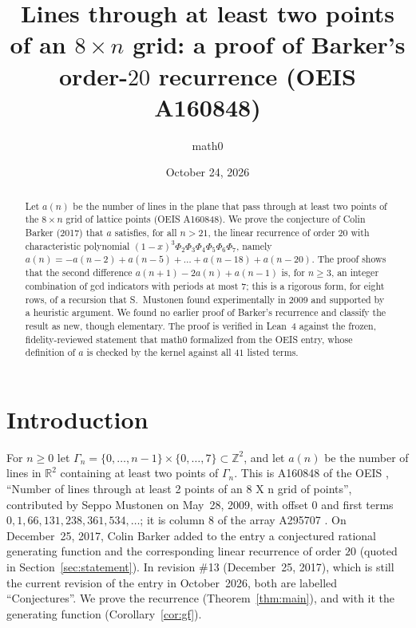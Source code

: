 \documentclass[11pt]{amsart}
\title[Barker's recurrence for lines through an $8\times n$ grid]{Lines through at least two points of an $8\times n$ grid: a proof of Barker's order-$20$ recurrence (OEIS A160848)}
\author{math0}
\date{October 24, 2026}
\theoremstyle{plain}
\theoremstyle{definition}
\newcommand{\Z}{\mathbb{Z}}
\begin{document}
\begin{abstract}
Let $a(n)$ be the number of lines in the plane that pass through at least two points of the $8\times n$ grid of lattice points (OEIS A160848).
We prove the conjecture of Colin Barker (2017) that $a$ satisfies, for all $n>21$, the linear recurrence of order $20$ with characteristic polynomial $(1-x)^3\Phi_2\Phi_3\Phi_4\Phi_5\Phi_6\Phi_7$, namely $a(n)=-a(n-2)+a(n-5)+\dots+a(n-18)+a(n-20)$.
The proof shows that the second difference $a(n+1)-2a(n)+a(n-1)$ is, for $n\ge3$, an integer combination of gcd indicators with periods at most $7$; this is a rigorous form, for eight rows, of a recursion that S.~Mustonen found experimentally in 2009 and supported by a heuristic argument.
We found no earlier proof of Barker's recurrence and classify the result as new, though elementary.
The proof is verified in Lean~4 against the frozen, fidelity-reviewed statement that math0 formalized from the OEIS entry, whose definition of $a$ is checked by the kernel against all $41$ listed terms.
\end{abstract}
\maketitle

\section{Introduction}

For $n\ge0$ let $\Gamma_n=\{0,\dots,n-1\}\times\{0,\dots,7\}\subset\Z^2$, and let $a(n)$ be the number of lines in $\mathbb R^2$ containing at least two points of $\Gamma_n$. This is A160848 of the OEIS \cite{A160848}, ``Number of lines through at least 2 points of an 8 X n grid of points'', contributed by Seppo Mustonen on May~28, 2009, with offset $0$ and first terms $0,1,66,131,238,361,534,\dots$; it is column $8$ of the array A295707 \cite{A295707}. On December~25, 2017, Colin Barker added to the entry a conjectured rational generating function and the corresponding linear recurrence of order $20$ (quoted in Section~\ref{sec:statement}). In revision \#13 (December~25, 2017), which is still the current revision of the entry in October~2026, both are labelled ``Conjectures''. We prove the recurrence (Theorem~\ref{thm:main}), and with it the generating function (Corollary~\ref{cor:gf}).
\end{document}
